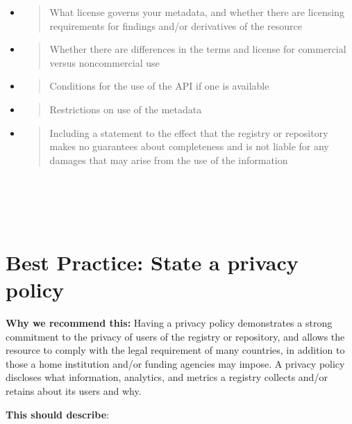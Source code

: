 \documentclass[]{article}
\begin{document}
\begin{itemize}
\item
  \begin{quote}
  What license governs your metadata, and whether there are licensing
  requirements for findings and/or derivatives of the resource
  \end{quote}
\item
  \begin{quote}
  Whether there are differences in the terms and license for commercial
  versus noncommercial use
  \end{quote}
\item
  \begin{quote}
  Conditions for the use of the API if one is available
  \end{quote}
\item
  \begin{quote}
  Restrictions on use of the metadata
  \end{quote}
\item
  \begin{quote}
  Including a statement to the effect that the registry or repository
  makes no guarantees about completeness and is not liable for any
  damages that may arise from the use of the information
  \end{quote}
\end{itemize}

\section{\texorpdfstring{\\
}{ }}\label{section-7}

\newpage
\section{Best Practice: State a privacy
policy}\label{best-practice-state-a-privacy-policy}

\textbf{Why we recommend this:} Having a privacy policy demonstrates a
strong commitment to the privacy of users of the registry or repository,
and allows the resource to comply with the legal requirement of many
countries, in addition to those a home institution and/or funding
agencies may impose. A privacy policy discloses what information,
analytics, and metrics a registry collects and/or retains about its
users and why.

\textbf{This should describe}:
\end{document}
